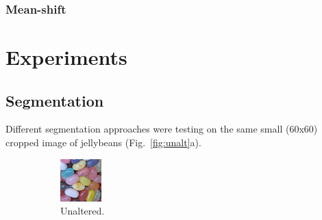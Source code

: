 \documentclass[12pt]{article}
\begin{document}
\subsubsection{Mean-shift}


\section{Experiments}

\subsection{Segmentation}

Different segmentation approaches were testing on the same small (60x60) cropped image of jellybeans (Fig.~\ref{fig:unalt}a).

\begin{figure}
    \centering
  \begin{subfigure}[b]{0.3\textwidth}
      \includegraphics[width=\textwidth]{fig/img3}
      \caption{Unaltered.}
  \end{subfigure}
   \begin{subfigure}[b]{0.3\textwidth}

\end{subfigure}
\end{figure}
\end{document}
